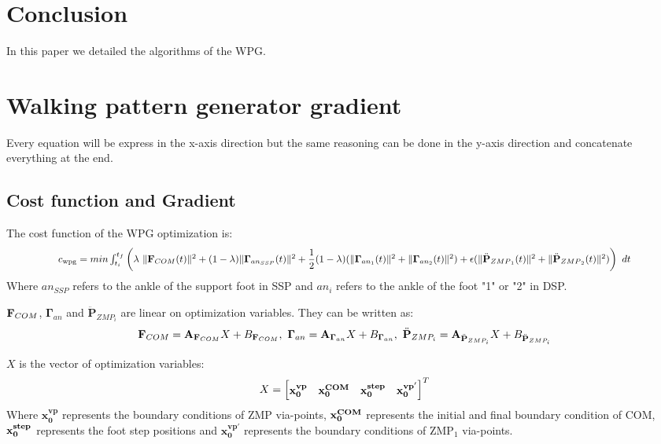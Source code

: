 \documentclass[journal]{IEEEtran}
\begin{document}
\section{Conclusion}
In this paper we detailed the algorithms of the WPG.



\onecolumn
\section{Walking pattern generator gradient}
Every equation will be express in the x-axis direction but the same reasoning can be done in the y-axis direction and concatenate everything at the end.
\subsection{Cost function and Gradient}
The cost function of the WPG optimization is:
\begin{equation}
\scalebox{0.9}{$
\label{eq:optim_criterion}
\mbox{c}_{\text{wpg}} = \mbox{min} \int_{t_{i}}^{t_{f}}{
\left(\lambda \ \Vert\mathbf{F}_{\mbox{\tiny COM}}(t)\Vert^{2} + (1-\lambda)  \Vert\mathbf{\Gamma}_{an_{SSP}}(t)\Vert^{2} + \dfrac{1}{2}(1-\lambda) ( \Vert\mathbf{\Gamma}_{an_1}(t)\Vert^{2} + \Vert\mathbf{\Gamma}_{an_2}(t)\Vert^{2} ) + \epsilon (\Vert\ddot{\mathbf{P}}_{\mbox{\tiny ZMP}_1}(t)\Vert^{2} + \Vert\ddot{\mathbf{P}}_{\mbox{\tiny ZMP}_2}(t)\Vert^{2})
 \right)
 \ \mbox{dt}}
 $}
\end{equation}
Where $an_{SSP}$ refers to the ankle of the support foot in SSP and $an_i$ refers to the ankle of the foot "1" or "2" in DSP.

$\mathbf{F}_{\mbox{\tiny COM}}$, $\mathbf{\Gamma}_{an}$ and $\ddot{\mathbf{P}}_{ZMP_i}$ are linear on optimization variables. They can be written as:
\begin{equation}
\mathbf{F}_{\mbox{\tiny COM}}=\mathbf{A}_{\mathbf{F}_{\mbox{\tiny COM}}} X + B_{\mathbf{F}_{\mbox{\tiny COM}}}, \ \mathbf{\Gamma}_{an}=\mathbf{A}_{\mathbf{\Gamma}_{an}} X + B_{\mathbf{\Gamma}_{an}}, \ \ddot{\mathbf{P}}_{ZMP_i}=\mathbf{A}_{\ddot{\mathbf{P}}_{ZMP_i}} X + B_{\ddot{\mathbf{P}}_{ZMP_i}} 
\end{equation}

$X$ is the vector of optimization variables:
\begin{equation}
X=
\begin{bmatrix}
\mathbf{x^{vp}_0} &
\mathbf{x^{\mbox{\tiny COM}}_0} &
\mathbf{x^{\mbox{\tiny step}}_0} &
\mathbf{x^{vp'}_0}
\end{bmatrix}^{T}
\end{equation}
Where $\mathbf{x^{vp}_0}$ represents the boundary conditions of ZMP via-points, $\mathbf{x^{\mbox{\tiny COM}}_0}$ represents the initial and final boundary condition of COM, $\mathbf{x^{\mbox{\tiny step}}_0}$ represents the foot step positions and $\mathbf{x^{vp'}_0}$ represents the boundary conditions of ZMP$_1$ via-points.
\end{document}
